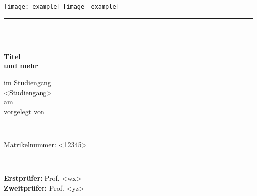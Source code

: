 \newcommand{\HRule}[2]{\noindent\rule[#1]{\linewidth}{#2}}
\newcommand{\vlinespace}[1]{\vspace*{#1\baselineskip}}
\newcommand{\titleemph}[1]{\textbf{#1}}
\begin{titlepage}
    \sffamily
    \texttt{[image: example]}
    \hfill
    \texttt{[image: example]}
    \HRule{13pt}{1pt}
    \centering
    \vlinespace{5}\\
    \workTyp\\
    \begin{Large}
        \textbf{Titel}\\
        \textbf{und mehr}\\
    \end{Large}
    \vlinespace{4}
    im Studiengang\\
    <Studiengang>\\
    am \workDatum\\
    \vlinespace{4}
    vorgelegt von\\
    \begin{Large}
        \textbf{\workNameStudent}\\
    \end{Large}
    \vlinespace{1}
    Matrikelnummer: <12345>
    \vfill
    \raggedright{}
    \HRule{13pt}{1pt} \\
    \titleemph{Erstprüfer:} Prof. <wx>\\
    \titleemph{Zweitprüfer:} Prof. <yz>
\end{titlepage}